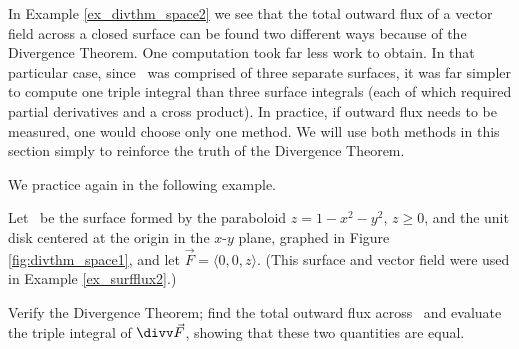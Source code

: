 In Example \ref{ex_divthm_space2} we see that the total outward flux of a vector field across a closed surface can be found two different ways because of the Divergence Theorem. One computation took far less work to obtain. In that particular case, since \surfaceS\ was comprised of three separate surfaces, it was far simpler to compute one triple integral than three surface integrals (each of which required partial derivatives and a cross product). In practice, if outward flux needs to be measured, one would choose only one method. We will use both methods in this section simply to reinforce the truth of the Divergence Theorem.

We practice again in the following example.\\
\enlargethispage{2\baselineskip}

{Let \surfaceS\ be the surface formed by the paraboloid $z=1-x^2-y^2$, $z\geq 0$, and the unit disk centered at the origin in the $x$-$y$ plane, graphed in Figure \ref{fig:divthm_space1}, and let $\vec F = \langle 0,0,z\rangle$. (This surface and vector field were used in Example \ref{ex_surfflux2}.)


Verify the Divergence Theorem; find the total outward flux across \surfaceS\ and evaluate the triple integral of $\divv \vec F$, showing that these two quantities are equal.
}
